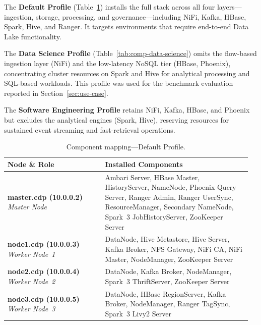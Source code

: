 The \textbf{Default Profile} (Table~\ref{tab:comp-default}) installs the full
stack across all four layers---ingestion, storage, processing, and
governance---including NiFi, Kafka, HBase, Spark, Hive, and Ranger. It targets
environments that require end-to-end Data Lake functionality.

The \textbf{Data Science Profile} (Table~\ref{tab:comp-data-science}) omits the
flow-based ingestion layer (NiFi) and the low-latency NoSQL tier (HBase,
Phoenix), concentrating cluster resources on Spark and Hive for analytical
processing and SQL-based workloads. This profile was used for the benchmark
evaluation reported in Section~\ref{sec:use-case}.

The \textbf{Software Engineering Profile} retains NiFi, Kafka, HBase, and
Phoenix but excludes the analytical engines (Spark, Hive), reserving resources
for sustained event streaming and fast-retrieval operations.

\begin{table}[htbp]
  \centering
  \caption{Component mapping---Default Profile.}
  \label{tab:comp-default}
  \renewcommand{\arraystretch}{1.2}
  \begin{tabular}{@{} p{0.38\linewidth} p{0.58\linewidth} @{}}
    \hline
    \textbf{Node \& Role} & \textbf{Installed Components} \\
    \hline
    \textbf{master.cdp (10.0.0.2)} \newline \textit{Master Node} & Ambari Server, HBase Master, HistoryServer, NameNode, Phoenix Query Server, Ranger Admin, Ranger UserSync, ResourceManager, Secondary NameNode, Spark~3 JobHistoryServer, ZooKeeper Server \\
    \hline
    \textbf{node1.cdp (10.0.0.3)} \newline \textit{Worker Node~1} & DataNode, Hive Metastore, Hive Server, Kafka Broker, NFS Gateway, NiFi CA, NiFi Master, NodeManager, ZooKeeper Server \\
    \hline
    \textbf{node2.cdp (10.0.0.4)} \newline \textit{Worker Node~2} & DataNode, Kafka Broker, NodeManager, Spark~3 ThriftServer, ZooKeeper Server \\
    \hline
    \textbf{node3.cdp (10.0.0.5)} \newline \textit{Worker Node~3} & DataNode, HBase RegionServer, Kafka Broker, NodeManager, Ranger TagSync, Spark~3 Livy2 Server \\
    \hline
  \end{tabular}
\end{table}

